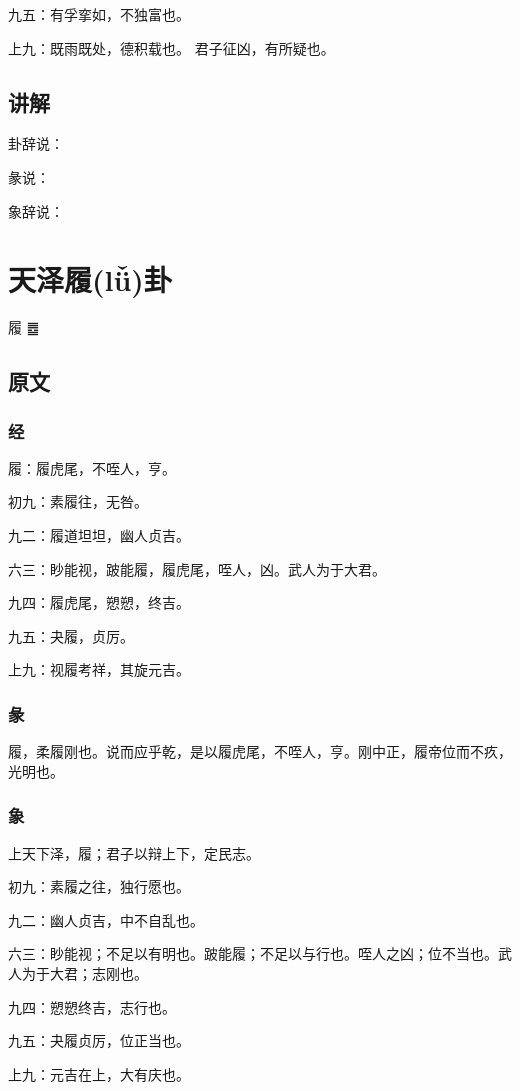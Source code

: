 \documentclass[12pt,oneside]{book}
\begin{document}
九五：有孚挛如，不独富也。

上九：既雨既处，德积载也。 君子征凶，有所疑也。


\section{讲解}
卦辞说：

彖说：

象辞说：

\chapter{天泽履(lǚ)卦}
履 {\Large ䷉}

\section{原文}

\subsection{经}
履：履虎尾，不咥人，亨。

初九：素履往，无咎。

九二：履道坦坦，幽人贞吉。

六三：眇能视，跛能履，履虎尾，咥人，凶。武人为于大君。

九四：履虎尾，愬愬，终吉。

九五：夬履，贞厉。

上九：视履考祥，其旋元吉。

\subsection{彖}
履，柔履刚也。说而应乎乾，是以履虎尾，不咥人，亨。刚中正，履帝位而不疚，光明也。

\subsection{象}
上天下泽，履；君子以辩上下，定民志。

初九：素履之往，独行愿也。

九二：幽人贞吉，中不自乱也。

六三：眇能视；不足以有明也。跛能履；不足以与行也。咥人之凶；位不当也。武人为于大君；志刚也。

九四：愬愬终吉，志行也。

九五：夬履贞厉，位正当也。

上九：元吉在上，大有庆也。
\end{document}
